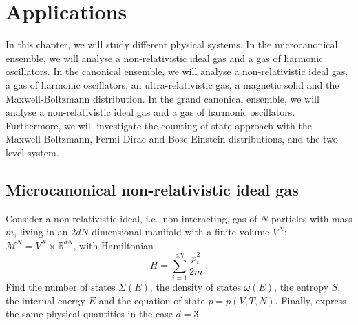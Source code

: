 \chapter{Applications}

    In this chapter, we will study different physical systems. In the microcanonical ensemble, we will analyse a non-relativistic ideal gas and a gas of harmonic oscillators. In the canonical ensemble, we will analyse a non-relativistic ideal gas, a gas of harmonic oscillators, an ultra-relativistic gas, a magnetic solid and the Maxwell-Boltzmann distribution. In the grand canonical ensemble, we will analyse a non-relativistic ideal gas and a gas of harmonic oscillators. Furthermore, we will investigate the counting of state approach with the Maxwell-Boltzmann, Fermi-Dirac and Bose-Einstein distributions, and the two-level system.

\section{Microcanonical non-relativistic ideal gas}

    \begin{exercise}
        Consider a non-relativistic ideal, i.e.~non-interacting, gas of $N$ particles with mass $m$, living in an $2dN$-dimensional manifold with a finite volume $V^N$: $\mathcal M^N = V^N \times \mathbb R^{dN}$, with Hamiltonian 
        \begin{equation*}
            H = \sum_{i=1}^{dN} \frac{p^2_i}{2m} ~.
        \end{equation*}
        Find the number of states $\Sigma(E)$, the density of states $\omega(E)$, the entropy $S$, the internal energy $E$ and the equation of state $p = p(V, T, N)$. Finally, express the same physical quantities in the case $d = 3$.
    \end{exercise}

